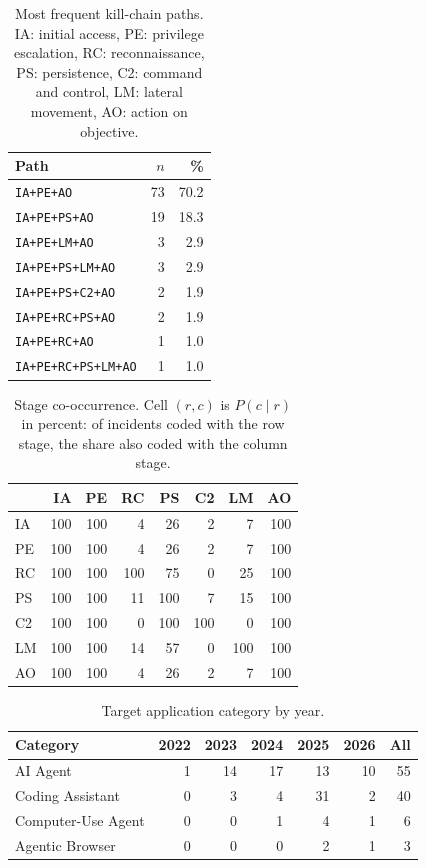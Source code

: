 \begin{table}[t]
\centering
\caption{Most frequent kill-chain paths. IA: initial access, PE: privilege escalation, RC: reconnaissance, PS: persistence, C2: command and control, LM: lateral movement, AO: action on objective.}
\label{tab:paths}
\begin{tabular}{lrr}
\toprule
Path & $n$ & \% \\
\midrule
\texttt{IA+PE+AO} & 73 & 70.2 \\
\texttt{IA+PE+PS+AO} & 19 & 18.3 \\
\texttt{IA+PE+LM+AO} & 3 & 2.9 \\
\texttt{IA+PE+PS+LM+AO} & 3 & 2.9 \\
\texttt{IA+PE+PS+C2+AO} & 2 & 1.9 \\
\texttt{IA+PE+RC+PS+AO} & 2 & 1.9 \\
\texttt{IA+PE+RC+AO} & 1 & 1.0 \\
\texttt{IA+PE+RC+PS+LM+AO} & 1 & 1.0 \\
\bottomrule
\end{tabular}
\end{table}

\begin{table}[t]
\centering
\caption{Stage co-occurrence. Cell $(r,c)$ is $P(c \mid r)$ in percent: of incidents coded with the row stage, the share also coded with the column stage.}
\label{tab:cooccurrence}
\begin{tabular}{lrrrrrrr}
\toprule
 & IA & PE & RC & PS & C2 & LM & AO \\
\midrule
IA & 100 & 100 & 4 & 26 & 2 & 7 & 100 \\
PE & 100 & 100 & 4 & 26 & 2 & 7 & 100 \\
RC & 100 & 100 & 100 & 75 & 0 & 25 & 100 \\
PS & 100 & 100 & 11 & 100 & 7 & 15 & 100 \\
C2 & 100 & 100 & 0 & 100 & 100 & 0 & 100 \\
LM & 100 & 100 & 14 & 57 & 0 & 100 & 100 \\
AO & 100 & 100 & 4 & 26 & 2 & 7 & 100 \\
\bottomrule
\end{tabular}
\end{table}

\begin{table}[t]
\centering
\caption{Target application category by year.}
\label{tab:category-year}
\begin{tabular}{lrrrrrr}
\toprule
Category & 2022 & 2023 & 2024 & 2025 & 2026 & All \\
\midrule
AI Agent & 1 & 14 & 17 & 13 & 10 & 55 \\
Coding Assistant & 0 & 3 & 4 & 31 & 2 & 40 \\
Computer-Use Agent & 0 & 0 & 1 & 4 & 1 & 6 \\
Agentic Browser & 0 & 0 & 0 & 2 & 1 & 3 \\
\bottomrule
\end{tabular}
\end{table}


